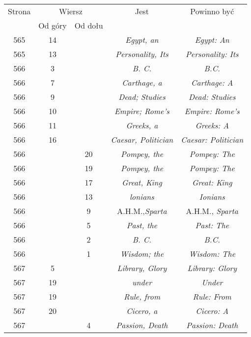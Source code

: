 \documentclass[a4paper,11pt]{article}
\begin{document}
\begin{center}
  \begin{tabular}{|c|c|c|c|c|}
    \hline
    Strona & \multicolumn{2}{c|}{Wiersz} & Jest
                              & Powinno być \\ \cline{2-3}
    & Od góry & Od dołu & & \\
    \hline
    565 & 14 & & \textit{Egypt, an} & \textit{Egypt: An} \\
    565 & 13 & & \textit{Personality, Its} & \textit{Personality: Its} \\
    566 & \hphantom{0}3 & & \textit{B. C.} & \textit{B.C.} \\
    566 & \hphantom{0}7 & & \textit{Carthage, a} & \textit{Carthage: A} \\
    566 & \hphantom{0}9 & & \textit{Dead; Studies}
    & \textit{Dead: Studies} \\
    566 & 10 & & \textit{Empire; Rome's} & \textit{Empire: Rome's} \\
    566 & 11 & & \textit{Greeks, a} & \textit{Greeks: A} \\
    566 & 16 & & \textit{Caesar, Politician}
           & \textit{Caesar: Politician} \\
    566 & & 20 & \textit{Pompey, the} & \textit{Pompey: The} \\
    566 & & 19 & \textit{Pompey, the} & \textit{Pompey: The} \\
    566 & & 17 & \textit{Great, King} & \textit{Great: King} \\
    566 & & 13 & \textit{lonians} & \textit{Ionians} \\
    566 & & \hphantom{0}9 & A.H.M.,\textit{Sparta}
    & A.H.M., \textit{Sparta} \\
    566 & & \hphantom{0}5 & \textit{Past, the} & \textit{Past: The} \\
    566 & & \hphantom{0}2 & \textit{B. C.} & \textit{B.C.} \\
    566 & & \hphantom{0}1 & \textit{Wisdom; the} & \textit{Wisdom: The} \\
    567 & \hphantom{0}5 & & \textit{Library, Glory}
    & \textit{Library: Glory} \\
    567 & 19 & & \textit{under} & \textit{Under} \\
    567 & 19 & & \textit{Rule, from} & \textit{Rule: From} \\
    567 & 20 & & \textit{Cicero, a} & \textit{Cicero: A} \\
    567 & & \hphantom{0}4 & \textit{Passion, Death}
    & \textit{Passion: Death} \\

\end{tabular}
\end{center}
\end{document}
